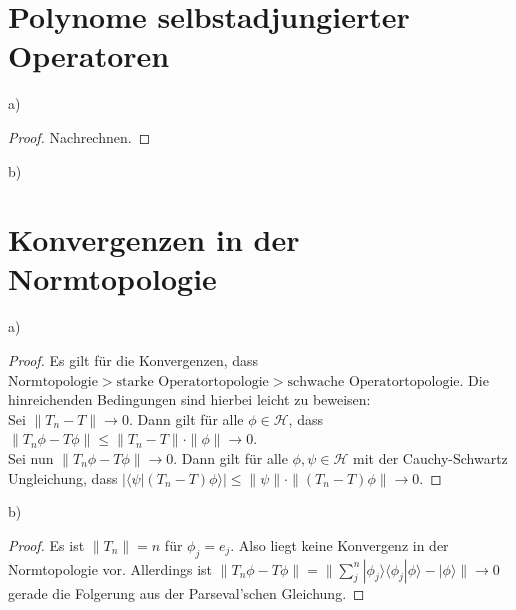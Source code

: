 \documentclass[a4paper,12pt]{article}
\newcommand{\brak}{}
\newcommand{\oper}{}
\newcommand{\tecxt}{}
\newcommand{\Ket}{}
\begin{document}
\section{Polynome selbstadjungierter Operatoren}
a)
\begin{proof}
Nachrechnen.
\end{proof}
b)
\section{Konvergenzen in der Normtopologie}
a)
\begin{proof}
Es gilt für die Konvergenzen, dass $\tecxt\text{Normtopologie}>\tecxt\text{starke Operatortopologie}>\tecxt\text{schwache Operatortopologie}$. Die hinreichenden Bedingungen sind hierbei leicht zu beweisen:\\
Sei $\|T_n-T\|\rightarrow 0$. Dann gilt für alle $\phi\in\mathcal{H}$, dass $\|T_n\phi-T\phi\|\le\|T_n-T\|\cdot\|\phi\|\rightarrow 0$.\\
Sei nun $\|T_n\phi-T\phi\|\rightarrow 0$. Dann gilt für alle $\phi,\psi\in\mathcal{H}$ mit der Cauchy-Schwartz Ungleichung, dass $|\brak\langle {\psi}| {(T_n-T)\phi}\rangle|\le\|\psi\|\cdot\|(T_n-T)\phi\|\rightarrow 0$.
\end{proof}
b)
\begin{proof}
Es ist $\|T_n\|=n$ für $\phi_j=e_j$. Also liegt keine Konvergenz in der Normtopologie vor. Allerdings ist $\|T_n\phi -T\phi\|=\|\sum_j^n\oper | {\phi_j} \rangle\langle {\phi_j} |\phi\rangle -\Ket | {\phi} \rangle\|\rightarrow 0$ gerade die Folgerung aus der Parseval'schen Gleichung.
\end{proof}
\end{document}
